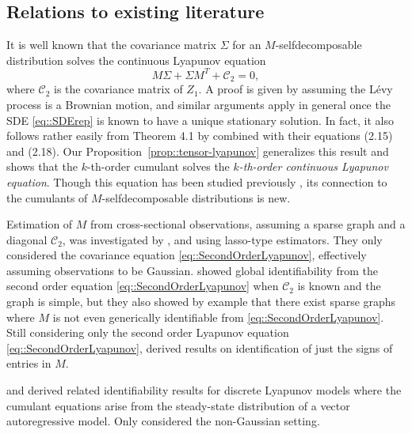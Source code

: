 \documentclass{biometrika}
\begin{document}
\subsection{Relations to existing literature}

It is well known that the covariance matrix $\Sigma$ for an $M$-selfdecomposable distribution
solves the continuous Lyapunov equation 
\begin{equation}
\label{eq::SecondOrderLyapunov}
    M \Sigma + \Sigma M^T + \mathcal{C}_2 = 0,
\end{equation}
where $\mathcal{C}_2$ is the covariance matrix of $Z_1$. A proof is given by
\cite{Jacobsen+1993+86+94} assuming the Lévy process is a Brownian motion, and similar
arguments apply in general once the SDE \eqref{eq::SDErep} is known to have a 
unique stationary solution. In fact, it 
also follows rather easily from Theorem 4.1 by \cite{Sato:1984} combined with their 
equations (2.15) and (2.18). Our Proposition~\ref{prop::tensor-lyapunov} generalizes 
this result and shows that the $k$-th-order cumulant solves
the \emph{$k$-th-order continuous Lyapunov equation}. Though this equation has been
studied previously \citep{Xu:2021}, its connection to the cumulants of $M$-selfdecomposable
distributions is new. 

Estimation of $M$ from cross-sectional observations, assuming a sparse graph and a diagonal 
$\mathcal{C}_2$, was
investigated by \cite{fitch2020learningdirectedgraphicalmodels}, \cite{varando20a} 
and \cite{pmlr-v236-dettling24a} using lasso-type estimators. They only considered 
the covariance equation \eqref{eq::SecondOrderLyapunov}, effectively assuming 
observations to be Gaussian.  
\cite{Dettling:2023} showed global identifiability from the second order equation \eqref{eq::SecondOrderLyapunov} when $\mathcal{C}_2$ is known and the 
graph is simple, but they also showed by example that there exist sparse graphs 
where $M$ is not even generically identifiable from \eqref{eq::SecondOrderLyapunov}. Still 
considering only the second order Lyapunov equation \eqref{eq::SecondOrderLyapunov},
\cite{vanseeventer2026signidentifiabilitycausaleffects} derived results on identification of 
just the signs of entries in $M$.


\cite{young2019identifying} and \cite{recke2026identifiabilitygraphicaldiscretelyapunov} derived related identifiability 
results for discrete Lyapunov models where the cumulant equations arise from the 
steady-state distribution of a vector autoregressive model. Only \cite{recke2026identifiabilitygraphicaldiscretelyapunov} considered the non-Gaussian setting. 
\end{document}
